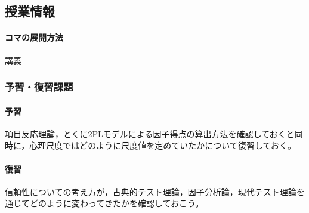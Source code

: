 \subsection{授業情報}
\paragraph{コマの展開方法}
講義
\subsubsection{予習・復習課題}
\paragraph{予習}項目反応理論，とくに2PLモデルによる因子得点の算出方法を確認しておくと同時に，心理尺度ではどのように尺度値を定めていたかについて復習しておく。
\paragraph{復習}信頼性についての考え方が，古典的テスト理論，因子分析論，現代テスト理論を通じてどのように変わってきたかを確認しておこう。
